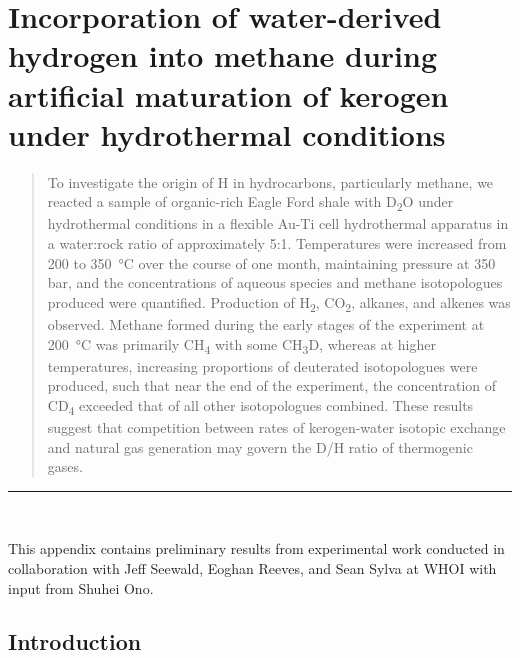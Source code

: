 \chapter{Incorporation of water-derived hydrogen into
	methane during artificial maturation of kerogen under hydrothermal
	conditions}\label{dx:B}



\begin{abstract}

	\noindent To investigate the origin of H in hydrocarbons, particularly methane, we
	reacted a sample of organic-rich Eagle Ford shale with
	D\textsubscript{2}O under hydrothermal conditions in a flexible Au-Ti
	cell hydrothermal apparatus in a water:rock ratio of approximately 5:1.
	Temperatures were increased from 200 to 350~°C over the course of one
	month, maintaining pressure at 350 bar, and the concentrations of
	aqueous species and methane isotopologues produced were quantified.
	Production of H\textsubscript{2}, CO\textsubscript{2}, alkanes, and
	alkenes was observed. Methane formed during the early stages of the
	experiment at 200~°C was primarily CH\textsubscript{4} with some
	CH\textsubscript{3}D, whereas at higher temperatures, increasing
	proportions of deuterated isotopologues were produced, such that near
	the end of the experiment, the concentration of CD\textsubscript{4}
	exceeded that of all other isotopologues combined. These results suggest
	that competition between rates of kerogen-water isotopic exchange and
	natural gas generation may govern the D/H ratio of thermogenic gases.

\end{abstract}

\vspace*{\fill}

\noindent \rule{\textwidth}{0.4pt}\\

{\small
	
	\noindent This appendix contains preliminary results from experimental work
	conducted in collaboration with Jeff Seewald, Eoghan Reeves, and Sean
	Sylva at WHOI with input from Shuhei Ono. \\
	
}

\clearpage


\section{Introduction}\label{introduction-4}

